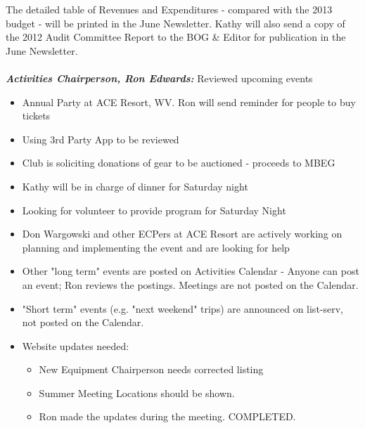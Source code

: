 \documentclass[10pt,a4paper]{article}
\begin{document}
\begin{multicols}{2}
The detailed table of Revenues and Expenditures - compared with the 2013 budget - will be printed in the June Newsletter. Kathy will also send a copy of the 2012 Audit Committee Report to the BOG \& Editor for publication in the June Newsletter.\\
\\
\textit{\textbf{Activities Chairperson, Ron Edwards:}}  Reviewed upcoming events\\
\begin{itemize}
\item Annual Party at ACE Resort, WV. Ron will send reminder for people to buy tickets
\item Using  3rd Party App to be reviewed
\item Club is soliciting donations of gear to be auctioned - proceeds to MBEG
\item Kathy will be in charge of dinner for Saturday night
\item Looking for volunteer to provide program for Saturday Night
\item Don Wargowski and other ECPers at ACE Resort are actively working on planning and implementing the event and are looking for help 
\item Other "long term" events are posted on Activities Calendar - Anyone can post  an event; Ron reviews the postings.  Meetings are not posted on the Calendar.  
\item "Short term" events (e.g. "next weekend" trips) are announced on list-serv, not posted on the Calendar.\item Website updates needed:  
\begin{itemize}
\item  New Equipment Chairperson needs corrected listing
\item Summer Meeting Locations should be shown.
\item Ron made the updates during the meeting.  COMPLETED.
\end{itemize}
\end{itemize}


\end{multicols}
\end{document}
